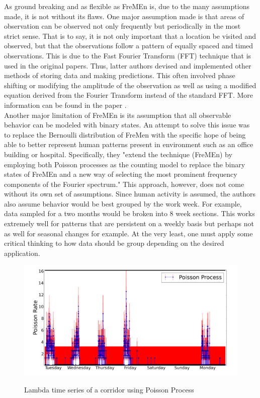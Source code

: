 As ground breaking and as flexible as FreMEn is, due to the many assumptions
made, it is not without its flaws. One major assumption made is that areas of
observation can be observed not only frequently but periodically in the most
strict sense. That is to say, it is not only important that a location be
visited and observed, but that the observations follow a pattern of equally
spaced and timed observations. This is due to the Fast Fourier Transform (FFT)
technique that is used in the original papers. Thus, latter authors devised and
implemented other methods of storing data and making predictions. This often
involved phase shifting or modifying the amplitude of the observation as well
as using a modified equation derived from the Fourier Transform instead of the
standard FFT. More information can be found in the paper \cite{Santos2016}. \\

Another major limitation of FreMEn is its assumption that all observable
behavior can be modeled with binary states. An  attempt to solve this issue
was to replace the Bernoulli distribution of FreMen with the specific hope of
being able to better represent human patterns present in environment such as
an office building or hospital. Specifically, they "extend the technique
(FreMEn) by employing both Poisson processes as the counting model to replace
the binary states of FreMEn and a new way of selecting the most prominent
frequency components of the Fourier spectrum."\cite{Jovan2016} This approach,
however, does not come without its own set of assumptions. Since human
activity is assumed, the authors also assume behavior would be best grouped by
the work week. For example, data sampled for a two months would be broken into
8 week sections. This works extremely well for patterns that are persistent on
a weekly basis but perhaps not as well for seasonal changes for example. At
the very least, one must apply some critical thinking to how data should be
group depending on the desired application.


\begin{figure}[!htb]
  \centering
  \includegraphics[width=\linewidth]{images/poisson-spectral-process.png}
  \caption{Lambda time series of a corridor using Poisson Process}
  \cite{Jovan2016}
  \label{figure:PSP}
\end{figure}

